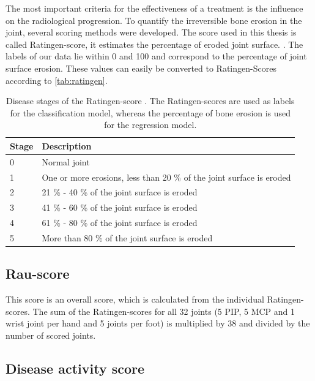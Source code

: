 \documentclass[12pt]{article}
\begin{document}
The most important criteria for the effectiveness of a treatment is the influence on the radiological progression. To quantify the irreversible bone erosion in the joint, several scoring methods were developed. The score used in this thesis is called Ratingen-score, it estimates the percentage of eroded joint surface. \cite{rau_2007}. The labels of our data lie within 0 and 100 and correspond to the percentage of joint surface erosion. These values can easily be converted to Ratingen-Scores according to \autoref{tab:ratingen}.


\begin{table}[ht]
\centering
\caption{Disease stages of the Ratingen-score \cite{rau_2007}. The Ratingen-scores are used as labels for the classification model, whereas the percentage of bone erosion is used for the regression model.}
\label{tab:ratingen}
\begin{tabular}{@{}ll@{}}
\toprule
Stage & Description                                                          \\ \midrule
0     & Normal joint                                                         \\
1     & One or more erosions, less than 20 \% of the joint surface is eroded \\
2     & 21 \% - 40 \% of the joint surface is eroded                         \\
3     & 41 \% - 60 \% of the joint surface is eroded                         \\
4     & 61 \% - 80 \% of the joint surface is eroded                         \\
5     & More than 80 \% of the joint surface is eroded                       \\ \bottomrule
\end{tabular}
\end{table}

\subsection{Rau-score}
\label{subsec:rau}

This score is an overall score, which is calculated from the individual Ratingen-scores. The sum of the Ratingen-scores for all 32 joints (5 PIP, 5 MCP and 1 wrist joint per hand and 5 joints per foot) is multiplied by 38 and divided by the number of scored joints.

\subsection{Disease activity score}
\label{subsec:das}
\end{document}
